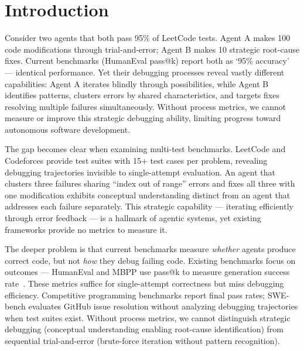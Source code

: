\section{Introduction}

Consider two agents that both pass 95\% of LeetCode tests. Agent A makes 100 code modifications through trial-and-error; Agent B makes 10 strategic root-cause fixes. Current benchmarks (HumanEval pass@k) report both as `95\% accuracy' — identical performance. Yet their debugging processes reveal vastly different capabilities: Agent A iterates blindly through possibilities, while Agent B identifies patterns, clusters errors by shared characteristics, and targets fixes resolving multiple failures simultaneously. Without process metrics, we cannot measure or improve this strategic debugging ability, limiting progress toward autonomous software development.

The gap becomes clear when examining multi-test benchmarks. LeetCode and Codeforces provide test suites with 15+ test cases per problem, revealing debugging trajectories invisible to single-attempt evaluation. An agent that clusters three failures sharing ``index out of range'' errors and fixes all three with one modification exhibits conceptual understanding distinct from an agent that addresses each failure separately. This strategic capability — iterating efficiently through error feedback — is a hallmark of agentic systems, yet existing frameworks provide no metrics to measure it.

The deeper problem is that current benchmarks measure \emph{whether} agents produce correct code, but not \emph{how} they debug failing code. Existing benchmarks focus on outcomes — HumanEval and MBPP use pass@k to measure generation success rate~\cite{Chen2021Evaluating, Austin2021Program}. These metrics suffice for single-attempt correctness but miss debugging efficiency. Competitive programming benchmarks report final pass rates; SWE-bench evaluates GitHub issue resolution without analyzing debugging trajectories when test suites exist. Without process metrics, we cannot distinguish strategic debugging (conceptual understanding enabling root-cause identification) from sequential trial-and-error (brute-force iteration without pattern recognition).


